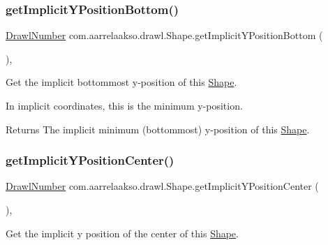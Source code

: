 \subsubsection{\texorpdfstring{get\+Implicit\+Y\+Position\+Bottom()}{getImplicitYPositionBottom()}}
{\footnotesize\ttfamily \hyperlink{classcom_1_1aarrelaakso_1_1drawl_1_1_drawl_number}{Drawl\+Number} com.\+aarrelaakso.\+drawl.\+Shape.\+get\+Implicit\+Y\+Position\+Bottom (\begin{DoxyParamCaption}{ }\end{DoxyParamCaption})\hspace{0.3cm}{\ttfamily [protected]}, {\ttfamily [inherited]}}



Get the implicit bottommost y-\/position of this \hyperlink{classcom_1_1aarrelaakso_1_1drawl_1_1_shape}{Shape}. 

In implicit coordinates, this is the minimum y-\/position.

\begin{DoxyReturn}{Returns}
The implicit minimum (bottommost) y-\/position of this \hyperlink{classcom_1_1aarrelaakso_1_1drawl_1_1_shape}{Shape}. 
\end{DoxyReturn}
\mbox{\label{classcom_1_1aarrelaakso_1_1drawl_1_1_shape_a0549739ee3201ae16091acce4ee6a5ac}} 
\subsubsection{\texorpdfstring{get\+Implicit\+Y\+Position\+Center()}{getImplicitYPositionCenter()}}
{\footnotesize\ttfamily \hyperlink{classcom_1_1aarrelaakso_1_1drawl_1_1_drawl_number}{Drawl\+Number} com.\+aarrelaakso.\+drawl.\+Shape.\+get\+Implicit\+Y\+Position\+Center (\begin{DoxyParamCaption}{ }\end{DoxyParamCaption})\hspace{0.3cm}{\ttfamily [protected]}, {\ttfamily [inherited]}}



Get the implicit y position of the center of this \hyperlink{classcom_1_1aarrelaakso_1_1drawl_1_1_shape}{Shape}. 

